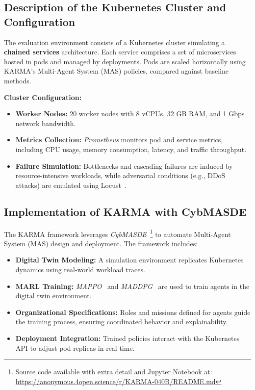 \documentclass[conference]{IEEEtran}
\begin{document}
\subsection{Description of the Kubernetes Cluster and Configuration}

The evaluation environment consists of a Kubernetes cluster simulating a \textbf{chained services} architecture. Each service comprises a set of microservices hosted in pods and managed by deployments. Pods are scaled horizontally using KARMA's Multi-Agent System (MAS) policies, compared against baseline methods.

\textbf{Cluster Configuration:}
\begin{itemize}
    \item \textbf{Worker Nodes:} 20 worker nodes with 8 vCPUs, 32 GB RAM, and 1 Gbps network bandwidth.
    \item \textbf{Metrics Collection:} \textit{Prometheus} monitors pod and service metrics, including CPU usage, memory consumption, latency, and traffic throughput.
    \item \textbf{Failure Simulation:} Bottlenecks and cascading failures are induced by resource-intensive workloads, while adversarial conditions (e.g., DDoS attacks) are emulated using Locust~\cite{locust2021}.
\end{itemize}

\subsection{Implementation of KARMA with CybMASDE}

The KARMA framework leverages \textit{CybMASDE}~\footnote{Source code available with extra detail and Jupyter Notebook at: \url{https://anonymous.4open.science/r/KARMA-040B/README.md}} to automate Multi-Agent System (MAS) design and deployment. The framework includes:
\begin{itemize}
    \item \textbf{Digital Twin Modeling:} A simulation environment replicates Kubernetes dynamics using real-world workload traces.
    \item \textbf{MARL Training:} \textit{MAPPO}~\cite{yu2021mappo} and \textit{MADDPG}~\cite{lowe2017multi} are used to train agents in the digital twin environment.
    \item \textbf{Organizational Specifications:} Roles and missions defined for agents guide the training process, ensuring coordinated behavior and explainability.
    \item \textbf{Deployment Integration:} Trained policies interact with the Kubernetes API to adjust pod replicas in real time.
\end{itemize}
\end{document}
